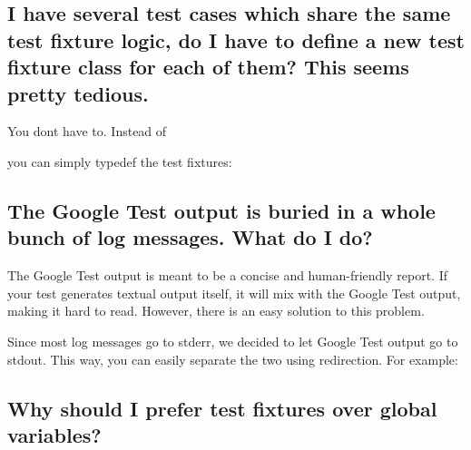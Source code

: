 \subsection*{I have several test cases which share the same test fixture logic, do I have to define a new test fixture class for each of them? This seems pretty tedious.}

You don\textquotesingle{}t have to. Instead of


\begin{DoxyCode}{0}
\DoxyCodeLine{}
\DoxyCodeLine{}
\DoxyCodeLine{}
\end{DoxyCode}


you can simply {\ttfamily typedef} the test fixtures\+: 
\begin{DoxyCode}{0}
\DoxyCodeLine{}
\DoxyCodeLine{}
\DoxyCodeLine{}
\end{DoxyCode}


\subsection*{The Google Test output is buried in a whole bunch of log messages. What do I do?}

The Google Test output is meant to be a concise and human-\/friendly report. If your test generates textual output itself, it will mix with the Google Test output, making it hard to read. However, there is an easy solution to this problem.

Since most log messages go to stderr, we decided to let Google Test output go to stdout. This way, you can easily separate the two using redirection. For example\+: 
\begin{DoxyCode}{0}
\end{DoxyCode}


\subsection*{Why should I prefer test fixtures over global variables?}

